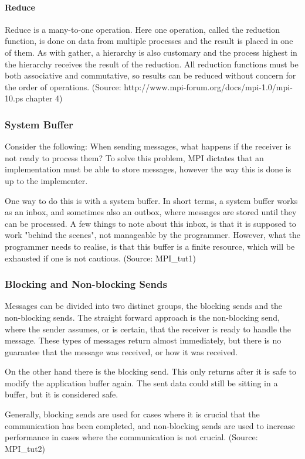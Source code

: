 \paragraph{Reduce}
Reduce is a many-to-one operation. Here one operation, called the reduction function, is done on data from multiple processes and the result is placed in one of them. As with gather, a hierarchy is also customary and the process highest in the hierarchy receives the result of the reduction. All reduction functions must be both associative and commutative, so results can be reduced without concern for the order of operations.
(Source: http://www.mpi-forum.org/docs/mpi-1.0/mpi-10.ps chapter 4)

\subsubsection{System Buffer}
Consider the following: When sending messages, what happens if the receiver is not ready to process them? To solve this problem, MPI dictates that an implementation must be able to store messages, however the way this is done is up to the implementer.

One way to do this is with a system buffer. In short terms, a system buffer works as an inbox, and sometimes also an outbox, where messages are stored until they can be processed. A few things to note about this inbox, is that it is supposed to work "behind the scenes", not manageable by the programmer. However, what the programmer needs to realise, is that this buffer is a finite resource, which will be exhausted if one is not cautious.
(Source: MPI\_tut1)

\subsubsection{Blocking and Non-blocking Sends}
Messages can be divided into two distinct groups, the blocking sends and the non-blocking sends. The straight forward approach is the non-blocking send, where the sender assumes, or is certain, that the receiver is ready to handle the message. These types of messages return almost immediately, but there is no guarantee that the message was received, or how it was received.

On the other hand there is the blocking send. This only returns after it is safe to modify the application buffer again. The sent data could still be sitting in a buffer, but it is considered safe.

Generally, blocking sends are used for cases where it is crucial that the communication has been completed, and non-blocking sends are used to increase performance in cases where the communication is not crucial.
(Source: MPI\_tut2)

